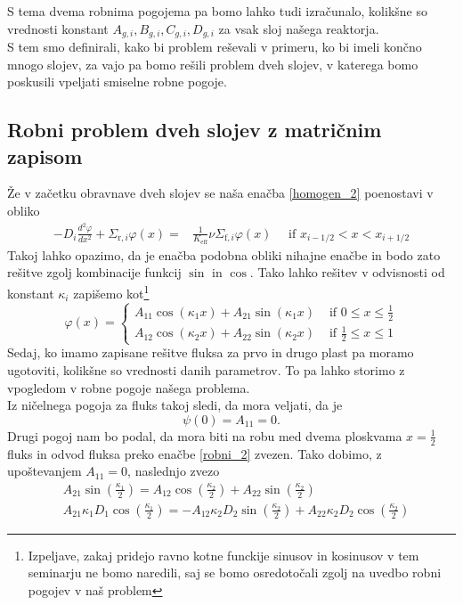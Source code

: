\documentclass[slovene,11pt,a4paper]{article}
\def\phi{\varphi}
\begin{document}
S tema dvema robnima pogojema pa bomo lahko tudi izračunalo, kolikšne so vrednosti konstant $A_{g, i},B_{g, i} ,C_{g, i} ,D_{g, i} $ za vsak sloj našega reaktorja. \\

S tem smo definirali, kako bi problem reševali v primeru, ko bi imeli končno mnogo slojev, za vajo pa bomo rešili problem dveh slojev, v katerega bomo poskusili vpeljati smiselne robne pogoje.
\subsection{Robni problem dveh slojev z matričnim zapisom}
Že v začetku obravnave dveh slojev se naša enačba \eqref{homogen_2} poenostavi v obliko
\begin{equation}
\begin{aligned}
-D_{i} \frac{d^{2} \phi}{d x^{2}}+\Sigma_{\mathrm{r}, i} \phi(x)=& \frac{1}{K_{\mathrm{eff}}} \nu \Sigma_{\mathrm{f}, i} \phi(x)  \quad \text { if } x_{i-1 / 2}<x<x_{i+1 / 2}
\end{aligned}
\end{equation}
Takoj lahko opazimo, da je enačba podobna obliki nihajne enačbe in bodo zato rešitve zgolj kombinacije funkcij $\sin$ in $\cos$. Tako lahko rešitev v odvisnosti od konstant $\kappa_i$ zapišemo kot\footnote{Izpeljave, zakaj pridejo ravno kotne funckije sinusov in kosinusov v tem seminarju ne bomo naredili, saj se bomo osredotočali zgolj na uvedbo robni pogojev v naš problem}
\begin{equation}
\phi(x)= \begin{cases}A_{11} \cos \left(\kappa_{1} x\right)+A_{21} \sin \left(\kappa_{1} x\right) & \text { if } 0 \leq x \leq \frac{1}{2} \\ A_{12} \cos \left(\kappa_{2} x\right)+A_{22} \sin \left(\kappa_{2} x\right) & \text { if } \frac{1}{2} \leq x \leq 1\end{cases}
\end{equation}
Sedaj, ko imamo zapisane rešitve fluksa za prvo in drugo plast pa moramo ugotoviti, kolikšne so vrednosti danih parametrov. To pa lahko storimo z vpogledom v robne pogoje našega problema. \\

Iz ničelnega pogoja za fluks takoj sledi, da mora veljati, da je
\begin{equation}
    \psi(0)=A_{11}=0.
\end{equation}
Drugi pogoj nam bo podal, da mora biti na robu med dvema ploskvama $x=\frac{1}{2}$ fluks in odvod fluksa preko enačbe \eqref{robni_2} zvezen. Tako dobimo, z upoštevanjem $A_{11}=0$, naslednjo zvezo
\begin{equation}
\begin{aligned}
&A_{21} \sin \left(\frac{\kappa_{1}}{2}\right)=A_{12} \cos \left(\frac{\kappa_{2}}{2}\right)+A_{22} \sin \left(\frac{\kappa_{2}}{2}\right) \\
&A_{21} \kappa_{1} D_{1} \cos \left(\frac{\kappa_{1}}{2}\right)=-A_{12} \kappa_{2} D_{2} \sin \left(\frac{\kappa_{2}}{2}\right)+A_{22} \kappa_{2} D_{2} \cos \left(\frac{\kappa_{2}}{2}\right)
\end{aligned}
\end{equation}
\end{document}
